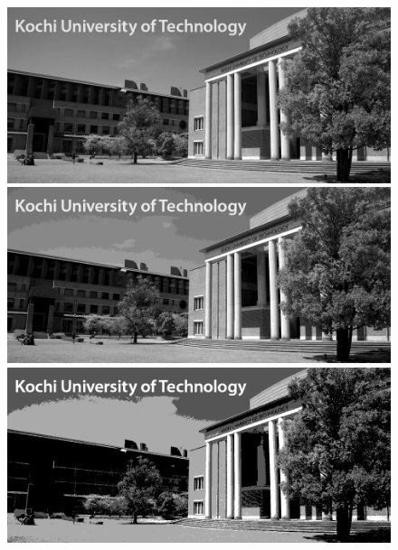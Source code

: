 \begin{figure}[H]
\begin{minipage}[b]{.23\textwidth}
        \centering
        \includegraphics[keepaspectratio,width=\textwidth]{../../Figures/05_21_gimg.png}
    \end{minipage}
    \begin{minipage}[b]{.23\textwidth}
        \centering
        \includegraphics[keepaspectratio,width=\textwidth]{../../Figures/05_22_4bit.png}
    \end{minipage}
    \begin{minipage}[b]{.23\textwidth}
        \centering
        \includegraphics[keepaspectratio,width=\textwidth]{../../Figures/05_23_2bit.png}
    \end{minipage}
    \begin{minipage}[b]{.23\textwidth}

\end{minipage}
\end{figure}
